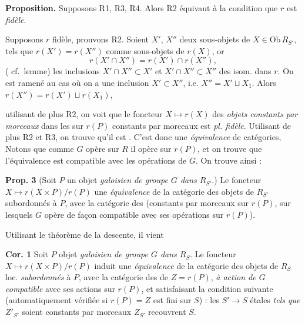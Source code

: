 \documentclass[11pt,a4paper]{article}
\begin{document}



\textbf{Proposition.} Supposons R1, R3, R4. Alors R2 équivaut à la condition
que $r$ est \emph{fidèle}.

Supposons $r$ fidèle, prouvons R2. Soient $X'$, $X''$ deux sous-objets de
$X \in \mathrm{Ob}\,R_{S'}$, tels que $r(X') = r(X'')$ comme sous-objets
de $r(X)$,  or
\[
  r(X' \cap X'') = r(X') \cap r(X''),
\]
(\struck{\ill{}} cf.\ lemme)  les inclusions
 $X' \cap X'' \subset X'$ et $X' \cap X'' \subset X''$  des
isom. dans $r$. On est ramené au cas où on a  une inclusion
$X' \subset X''$, i.e. $X'' = X' \sqcup X_1$. Alors
$r(X'') = r(X') \sqcup r(X_1)$, 


\struck{\ill{}} utilisant de plus R2, on voit que le foncteur
$X \mapsto r(X)$ des \struck{\ill{}} \emph{objets constants par morceaux} dans
les \ill{} sur $r(P)$ constants par morceaux est \emph{pl. fidèle}. Utilisant
de plus R2 et R3, on trouve qu'il est .
C'est donc une \emph{équivalence} de catégories,  Notons que comme
$G$ opère sur $R$ il opère sur $r(P)$,  et on trouve que
l'équivalence est compatible avec les opérations de $G$. On trouve ainsi :


\textbf{Prop. 3} (Soit $P$ un objet \emph{galoisien de groupe $G$ dans
$R_{S'}$}.) Le foncteur $X \mapsto r(X \times P)/r(P)$ \ill{} une
\emph{équivalence} de la catégorie des objets de $R_{S'}$ subordonnés à $P$,
avec la catégorie des  (constants par morceaux sur
$r(P)$, sur lesquels $G$ opère de façon compatible avec ses opérations sur
$r(P)$).

Utilisant le théorème de la descente, il vient

\textbf{Cor. 1} Soit $P$ objet \emph{galoisien de groupe $G$ dans $R_S$}. Le
foncteur $X \mapsto r(X \times P)/r(P)$ induit une \emph{équivalence} de la
catégorie des objets de $R_S$ loc. \emph{subordonnés} à $P$, avec la catégorie
des  \struck{\ill{}} de $Z = r(P)$, \emph{à action
de $G$ compatible} avec ses actions sur $r(P)$, et satisfaisant la condition
suivante (automatiquement vérifiée si $r(P) = Z$ est fini sur $S$) : les
$S' \to S$ étales \emph{tels que} $Z'_{S'}$  soient
constants par morceaux \ill{} $Z_{S'}$ recouvrent $S$.
\end{document}
